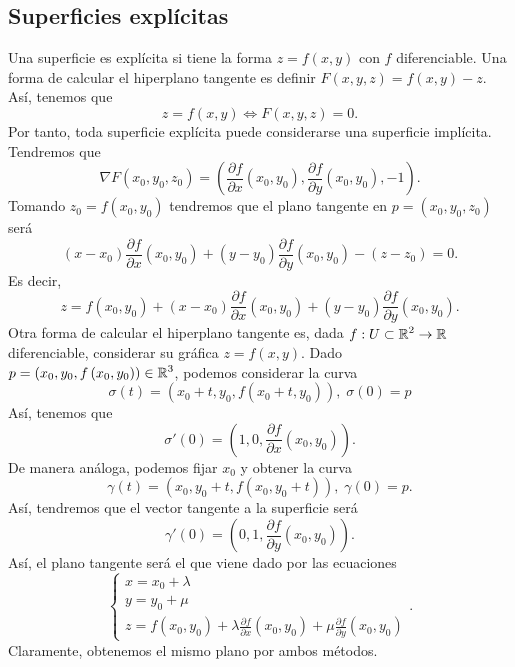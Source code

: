\subsection*{Superficies explícitas}
Una superficie es explícita si tiene la forma $\displaystyle z = f\left(x,y\right) $ con $\displaystyle f $ diferenciable. Una forma de calcular el hiperplano tangente es definir $\displaystyle F\left(x,y,z\right)= f\left(x,y\right) -z $. Así, tenemos que
\[z = f\left(x,y\right) \iff F\left(x,y,z\right) = 0 .\]
Por tanto, toda superficie explícita puede considerarse una superficie implícita. Tendremos que
\[\nabla F\left(x_{0}, y_{0},z_{0}\right) = \left(\frac{\partial f}{\partial x}\left(x_{0}, y_{0}\right), \frac{\partial f}{\partial y}\left(x_{0}, y_{0}\right), -1\right) .\]
Tomando $\displaystyle z_{0} = f\left(x_{0}, y_{0}\right) $ tendremos que el plano tangente en $\displaystyle p=\left(x_{0}, y_{0}, z_{0}\right) $ será
\[\left(x-x_{0}\right)\frac{\partial f}{\partial x}\left(x_{0}, y_{0}\right) + \left(y - y_{0}\right)\frac{\partial f}{\partial y}\left(x_{0}, y_{0}\right) - \left(z - z_{0}\right) = 0.\]
Es decir,
\[z = f\left(x_{0}, y_{0}\right) + \left(x-x_{0}\right)\frac{\partial f}{\partial x}\left(x_{0}, y_{0}\right) + \left(y - y_{0}\right)\frac{\partial f}{\partial y}\left(x_{0}, y_{0}\right) .\]
Otra forma de calcular el hiperplano tangente es, dada $\displaystyle f : U\subset \mathbb{R}^{2} \to \mathbb{R} $ diferenciable, considerar su gráfica $\displaystyle z = f\left(x,y\right) $. Dado $\displaystyle p=\left(x_{0},y_{0}, f\left(x_{0}, y_{0}\right)\right) \in \mathbb{R}^{3}$, podemos considerar la curva
\[\sigma\left(t\right) = \left(x_{0}+t, y_{0}, f\left(x_{0}+t,y_{0}\right)\right) , \; \sigma\left(0\right) = p\]
Así, tenemos que 
\[\sigma'\left(0\right) = \left(1,0, \frac{\partial f}{\partial x}\left(x_{0}, y_{0}\right)\right).\]
De manera análoga, podemos fijar $\displaystyle x_{0} $ y obtener la curva
\[\gamma \left(t\right)= \left(x_{0}, y_{0}+t, f\left(x_{0}, y_{0}+t\right)\right), \; \gamma\left(0\right) = p .\]
Así, tendremos que el vector tangente a la superficie será 
\[\gamma'\left(0\right) = \left(0,1,\frac{\partial f}{\partial y}\left(x_{0}, y_{0}\right)\right) .\]
Así, el plano tangente será el que viene dado por las ecuaciones
\[
\begin{cases}
x = x_{0} + \lambda \\
y = y_{0} + \mu \\
z = f\left(x_{0}, y_{0}\right) + \lambda \frac{\partial f}{\partial x}\left(x_{0}, y_{0}\right) + \mu \frac{\partial f}{\partial y}\left(x_{0}, y_{0}\right)
\end{cases}
.\]
Claramente, obtenemos el mismo plano por ambos métodos.
